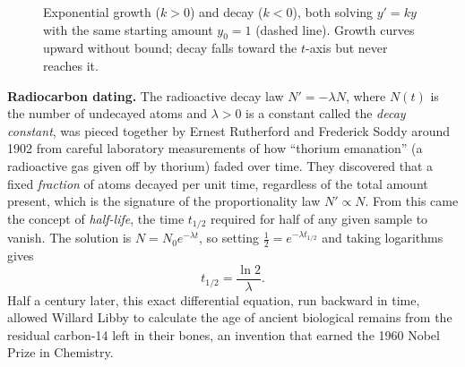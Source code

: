 \begin{figure}[htbp]
\centering
{}
\caption{Exponential growth ($k>0$) and decay ($k<0$), both solving $y'=ky$ with the
same starting amount $y_0=1$ (dashed line). Growth curves upward without bound; decay
falls toward the $t$-axis but never reaches it.}
\label{ch37:growth-decay}
\end{figure}

\begin{connectionbox}
\textbf{Radiocarbon dating.} The radioactive decay law $N'=-\lambda N$, where
$N(t)$ is the number of undecayed atoms and $\lambda>0$ is a constant called the
\emph{decay constant}, was pieced together by Ernest Rutherford and Frederick
Soddy around 1902 from careful laboratory measurements of how ``thorium
emanation'' (a radioactive gas given off by thorium) faded over time. They
discovered that a fixed \emph{fraction} of atoms decayed per unit time,
regardless of the total amount present, which is the signature of the
proportionality law $N'\propto N$. From this came the concept of
\emph{half-life}, the time $t_{1/2}$ required for half of any given sample to
vanish. The solution is $N=N_0e^{-\lambda t}$, so setting
$\tfrac12 = e^{-\lambda t_{1/2}}$ and taking logarithms gives
\[
  t_{1/2} = \frac{\ln 2}{\lambda}.
\]
Half a century later, this exact differential
equation, run backward in time, allowed Willard Libby to calculate the age of
ancient biological remains from the residual carbon-14 left in their bones, an
invention that earned the 1960 Nobel Prize in Chemistry.
\end{connectionbox}

